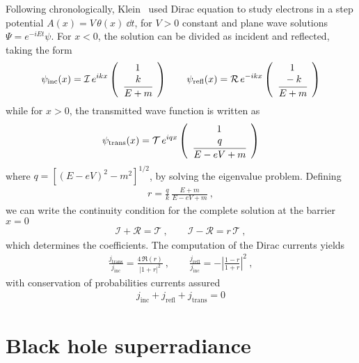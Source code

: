 Following chronologically, Klein~\cite{Klein1929} used Dirac equation to study electrons in a step potential $A(x) = V\,\theta(x) ~\dd t$, for $V>0$ constant and plane wave solutions $\Psi= e^{-i E t} \psi$. For $x<0$, the solution can be divided as incident and reflected, taking the form
\begin{align}
    \psi_\mathrm{inc}(x) = \mathcal{I}\, e^{i k x} \left(\begin{array}{c} 1 \\ \cfrac{k}{E+m} \end{array}\right) \qquad
    \psi_\mathrm{refl}(x) = \mathcal{R}\, e^{- i k x} \left(\begin{array}{c} 1 \\ \cfrac{-k}{E+m} \end{array}\right)
\end{align}
while for $x>0$, the transmitted wave function is written as 
\begin{align}
    \psi_\mathrm{trans}(x) = \mathcal{T}\, e^{i q x} \left(\begin{array}{c} 1 \\ \cfrac{q}{ E - e V + m} \end{array}\right)
\end{align}
where $q = [(E-e V)^2 - m^2]^{1/2}$, by solving the eigenvalue problem. Defining
\begin{align}
    r = \frac{q}{k}\,\frac{E+m}{E-e V+m} ~,
\end{align}
we can write the continuity condition for the complete solution at the barrier $x=0$
\begin{align}
    \mathcal{I} + \mathcal{R} = \mathcal{T} ~,\qquad \mathcal{I} - \mathcal{R} = r\, \mathcal{T} ~,
\end{align}
which determines the coefficients. The computation of the Dirac currents yields
\begin{align}
    \frac{j_\mathrm{trans}}{j_\mathrm{inc}} = \frac{4 \,\Re(r)}{|1+r|^2}  ~,\qquad \frac{j_\mathrm{refl}}{j_\mathrm{inc}} = - \left|\frac{1-r}{1+r}\right|^2 ~, 
\end{align}
with conservation of probabilities currents assured
\begin{align}
    j_\mathrm{inc} + j_\mathrm{refl} + j_\mathrm{trans} = 0 
\end{align}







\section{Black hole superradiance}




\cleardoublepage
